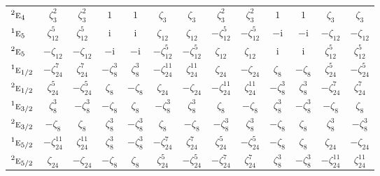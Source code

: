 \documentclass[10pt,a4paper]{article}
\makeatletter
\def\grouprule#1#2{\noalign{\marks\LTgroupmarks{\the\belowrulesep}\nobreak\vskip#1%
  \vskip\aboverulesep}\multispan\LT@cols\unskip{\leaders\hrule\@height#2\hfill\kern\z@}\cr
  \noalign{\penalty\LTrulebreak\vskip\belowrulesep\global\@lastruleclass\z@}}
\numberwithin{equation}{section}
\newcommand{\irr}[1]{\text{\normalfont\scshape #1}}
\newcommand{\conjpair}[1]{{}^{#1}}
\newcommand{\iunit}{\mathrm{i}}
\newcommand{\rootunity}[1]{\zeta_{#1}}
\makeatother
\begin{document}
{\begin{longtable}{@{}lcccccccccccc@{}}
$\conjpair{2}\irr{e}_{4}$ & $\rootunity{3}^{2}$ & $\rootunity{3}^{2}$ & $1$ & $1$ & $\rootunity{3}$ & $\rootunity{3}$ & $\rootunity{3}^{2}$ & $\rootunity{3}^{2}$ & $1$ & $1$ & $\rootunity{3}$ & $\rootunity{3}$\\
$\conjpair{1}\irr{e}_{5}$ & $\rootunity{12}^{5}$ & $\rootunity{12}^{5}$ & $\iunit{}$ & $\iunit{}$ & $\rootunity{12}$ & $\rootunity{12}$ & $-\rootunity{12}^{5}$ & $-\rootunity{12}^{5}$ & $-\iunit{}$ & $-\iunit{}$ & $-\rootunity{12}$ & $-\rootunity{12}$\\
$\conjpair{2}\irr{e}_{5}$ & $-\rootunity{12}$ & $-\rootunity{12}$ & $-\iunit{}$ & $-\iunit{}$ & $-\rootunity{12}^{5}$ & $-\rootunity{12}^{5}$ & $\rootunity{12}$ & $\rootunity{12}$ & $\iunit{}$ & $\iunit{}$ & $\rootunity{12}^{5}$ & $\rootunity{12}^{5}$\\
\grouprule{0pt}{\lightrulewidth}
$\conjpair{1}\irr{e}_{1/2}$ & $-\rootunity{24}^{7}$ & $\rootunity{24}^{7}$ & $-\rootunity{8}^{3}$ & $\rootunity{8}^{3}$ & $-\rootunity{24}^{11}$ & $\rootunity{24}^{11}$ & $\rootunity{24}$ & $-\rootunity{24}$ & $\rootunity{8}$ & $-\rootunity{8}$ & $\rootunity{24}^{5}$ & $-\rootunity{24}^{5}$\\
$\conjpair{2}\irr{e}_{1/2}$ & $\rootunity{24}^{5}$ & $-\rootunity{24}^{5}$ & $\rootunity{8}$ & $-\rootunity{8}$ & $\rootunity{24}$ & $-\rootunity{24}$ & $-\rootunity{24}^{11}$ & $\rootunity{24}^{11}$ & $-\rootunity{8}^{3}$ & $\rootunity{8}^{3}$ & $-\rootunity{24}^{7}$ & $\rootunity{24}^{7}$\\
$\conjpair{1}\irr{e}_{3/2}$ & $\rootunity{8}^{3}$ & $-\rootunity{8}^{3}$ & $-\rootunity{8}$ & $\rootunity{8}$ & $-\rootunity{8}^{3}$ & $\rootunity{8}^{3}$ & $\rootunity{8}$ & $-\rootunity{8}$ & $\rootunity{8}^{3}$ & $-\rootunity{8}^{3}$ & $-\rootunity{8}$ & $\rootunity{8}$\\
$\conjpair{2}\irr{e}_{3/2}$ & $-\rootunity{8}$ & $\rootunity{8}$ & $\rootunity{8}^{3}$ & $-\rootunity{8}^{3}$ & $\rootunity{8}$ & $-\rootunity{8}$ & $-\rootunity{8}^{3}$ & $\rootunity{8}^{3}$ & $-\rootunity{8}$ & $\rootunity{8}$ & $\rootunity{8}^{3}$ & $-\rootunity{8}^{3}$\\
$\conjpair{1}\irr{e}_{5/2}$ & $-\rootunity{24}^{11}$ & $\rootunity{24}^{11}$ & $\rootunity{8}^{3}$ & $-\rootunity{8}^{3}$ & $-\rootunity{24}^{7}$ & $\rootunity{24}^{7}$ & $\rootunity{24}^{5}$ & $-\rootunity{24}^{5}$ & $-\rootunity{8}$ & $\rootunity{8}$ & $\rootunity{24}$ & $-\rootunity{24}$\\
$\conjpair{2}\irr{e}_{5/2}$ & $\rootunity{24}$ & $-\rootunity{24}$ & $-\rootunity{8}$ & $\rootunity{8}$ & $\rootunity{24}^{5}$ & $-\rootunity{24}^{5}$ & $-\rootunity{24}^{7}$ & $\rootunity{24}^{7}$ & $\rootunity{8}^{3}$ & $-\rootunity{8}^{3}$ & $-\rootunity{24}^{11}$ & $\rootunity{24}^{11}$\\

\end{longtable}}
\end{document}
